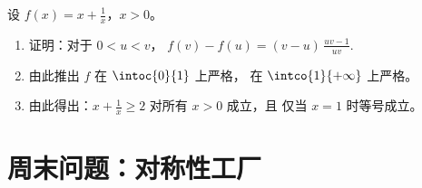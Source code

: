 \begin{exercise}[$\star\star\star$]\label{exo:g11:func:11}
设 $f(x) = x + \frac{1}{x}$，$x > 0$。
\begin{enumerate}
  \item 证明：对于 $0 < u < v$，
        $f(v) - f(u) = (v - u)\,\frac{uv - 1}{uv}$.
  \item 由此推出 $f$ 在 $\intoc{0}{1}$ 上严格，
        在 $\intco{1}{+\infty}$ 上严格。
  \item 由此得出：$x + \frac1x \geq 2$ 对所有 $x > 0$ 成立，且
        仅当 $x = 1$ 时等号成立。
\end{enumerate}
\end{exercise}

\section{周末问题：对称性工厂}

